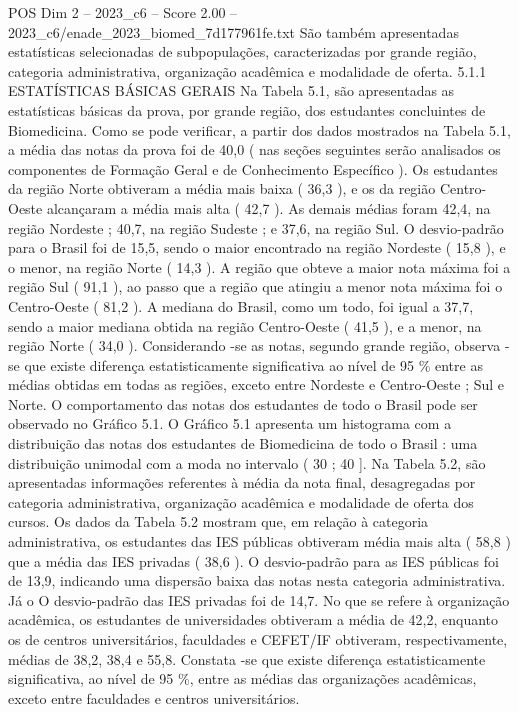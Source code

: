 \begin{textsample}{POS Dim 2 – 2023\_c6 – Score 2.00 – 2023\_c6/enade\_2023\_biomed\_7d177961fe.txt}
São também apresentadas estatísticas selecionadas de subpopulações, caracterizadas por grande região, categoria administrativa, organização acadêmica e modalidade de oferta. 5.1.1 ESTATÍSTICAS BÁSICAS GERAIS Na Tabela 5.1, são apresentadas as estatísticas básicas da prova, por grande região, dos estudantes concluintes de Biomedicina.
Como se pode verificar, a partir dos dados mostrados na Tabela 5.1, a média das notas da prova foi de 40,0 ( nas seções seguintes serão analisados os componentes de Formação Geral e de Conhecimento Específico ).
Os estudantes da região Norte obtiveram a média mais baixa ( 36,3 ), e os da região Centro-Oeste alcançaram a média mais alta ( 42,7 ).
As demais médias foram 42,4, na região Nordeste ; 40,7, na região Sudeste ; e 37,6, na região Sul.
O desvio-padrão para o Brasil foi de 15,5, sendo o maior encontrado na região Nordeste ( 15,8 ), e o menor, na região Norte ( 14,3 ).
A região que obteve a maior nota máxima foi a região Sul ( 91,1 ), ao passo que a região que atingiu a menor nota máxima foi o Centro-Oeste ( 81,2 ).
A mediana do Brasil, como um todo, foi igual a 37,7, sendo a maior mediana obtida na região Centro-Oeste ( 41,5 ), e a menor, na região Norte ( 34,0 ).
Considerando -se as notas, segundo grande região, observa -se que existe diferença estatisticamente significativa ao nível de 95 \% entre as médias obtidas em todas as regiões, exceto entre Nordeste e Centro-Oeste ; Sul e Norte.
O comportamento das notas dos estudantes de todo o Brasil pode ser observado no Gráfico 5.1.
O Gráfico 5.1 apresenta um histograma com a distribuição das notas dos estudantes de Biomedicina de todo o Brasil : uma distribuição unimodal com a moda no intervalo ( 30 ; 40 ].
Na Tabela 5.2, são apresentadas informações referentes à média da nota final, desagregadas por categoria administrativa, organização acadêmica e modalidade de oferta dos cursos.
Os dados da Tabela 5.2 mostram que, em relação à categoria administrativa, os estudantes das IES públicas obtiveram média mais alta ( 58,8 ) que a média das IES privadas ( 38,6 ).
O desvio-padrão para as IES públicas foi de 13,9, indicando uma dispersão baixa das notas nesta categoria administrativa.
Já o O desvio-padrão das IES privadas foi de 14,7.
No que se refere à organização acadêmica, os estudantes de universidades obtiveram a média de 42,2, enquanto os de centros universitários, faculdades e CEFET/IF obtiveram, respectivamente, médias de 38,2, 38,4 e 55,8.
Constata -se que existe diferença estatisticamente significativa, ao nível de 95 \%, entre as médias das organizações acadêmicas, exceto entre faculdades e centros universitários.

\end{textsample}
